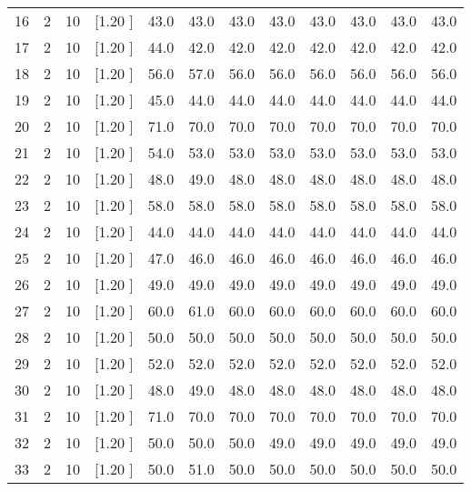 \documentclass[12pt,a4paper]{article}
\begin{document}
\begin{center}
{\begin{tabular}{r r r r r r r r r r r r}
  16&  2& 10&[1.20      ]&    43.0&    43.0&    43.0&    43.0&    43.0&    43.0&    43.0&    43.0\\[-0.02in]
  17&  2& 10&[1.20      ]&    44.0&    42.0&    42.0&    42.0&    42.0&    42.0&    42.0&    42.0\\[-0.02in]
  18&  2& 10&[1.20      ]&    56.0&    57.0&    56.0&    56.0&    56.0&    56.0&    56.0&    56.0\\[-0.02in]
  19&  2& 10&[1.20      ]&    45.0&    44.0&    44.0&    44.0&    44.0&    44.0&    44.0&    44.0\\[-0.02in]
  20&  2& 10&[1.20      ]&    71.0&    70.0&    70.0&    70.0&    70.0&    70.0&    70.0&    70.0\\[-0.02in]
  21&  2& 10&[1.20      ]&    54.0&    53.0&    53.0&    53.0&    53.0&    53.0&    53.0&    53.0\\[-0.02in]
  22&  2& 10&[1.20      ]&    48.0&    49.0&    48.0&    48.0&    48.0&    48.0&    48.0&    48.0\\[-0.02in]
  23&  2& 10&[1.20      ]&    58.0&    58.0&    58.0&    58.0&    58.0&    58.0&    58.0&    58.0\\[-0.02in]
  24&  2& 10&[1.20      ]&    44.0&    44.0&    44.0&    44.0&    44.0&    44.0&    44.0&    44.0\\[-0.02in]
  25&  2& 10&[1.20      ]&    47.0&    46.0&    46.0&    46.0&    46.0&    46.0&    46.0&    46.0\\[-0.02in]
  26&  2& 10&[1.20      ]&    49.0&    49.0&    49.0&    49.0&    49.0&    49.0&    49.0&    49.0\\[-0.02in]
  27&  2& 10&[1.20      ]&    60.0&    61.0&    60.0&    60.0&    60.0&    60.0&    60.0&    60.0\\[-0.02in]
  28&  2& 10&[1.20      ]&    50.0&    50.0&    50.0&    50.0&    50.0&    50.0&    50.0&    50.0\\[-0.02in]
  29&  2& 10&[1.20      ]&    52.0&    52.0&    52.0&    52.0&    52.0&    52.0&    52.0&    52.0\\[-0.02in]
  30&  2& 10&[1.20      ]&    48.0&    49.0&    48.0&    48.0&    48.0&    48.0&    48.0&    48.0\\[-0.02in]
  31&  2& 10&[1.20      ]&    71.0&    70.0&    70.0&    70.0&    70.0&    70.0&    70.0&    70.0\\[-0.02in]
  32&  2& 10&[1.20      ]&    50.0&    50.0&    50.0&    49.0&    49.0&    49.0&    49.0&    49.0\\[-0.02in]
  33&  2& 10&[1.20      ]&    50.0&    51.0&    50.0&    50.0&    50.0&    50.0&    50.0&    50.0\\[-0.02in]

\end{tabular}}
\end{center}
\end{document}
